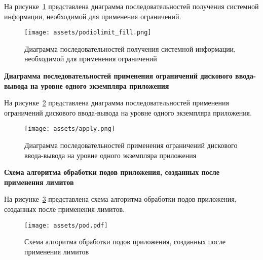 \newpage

На рисунке~\ref{img:fill} представлена диаграмма последовательностей получения системной информации, необходимой для применения ограничений.

\begin{figure}[h!]
    \centering
    \texttt{[image: assets/podiolimit\_fill.png]}
    \caption{Диаграмма последовательностей получения системной информации, необходимой для применения ограничений}
    \label{img:fill}
\end{figure}

\newpage

\textbf{Диаграмма последовательностей применения ограничений дискового ввода-вывода на уровне одного экземпляра приложения}

На рисунке~\ref{img:podiolimit} представлена диаграмма последовательностей применения ограничений дискового ввода-вывода на уровне одного экземпляра приложения.

\begin{figure}[h!]
    \centering
    \texttt{[image: assets/apply.png]}
    \caption{Диаграмма последовательностей применения ограничений дискового ввода-вывода на уровне одного экземпляра приложения}
    \label{img:podiolimit}
\end{figure}

\newpage

\textbf{Схема алгоритма обработки подов приложения, созданных после применения лимитов}

На рисунке~\ref{img:pod} представлена схема алгоритма обработки подов приложения, созданных после применения лимитов.

\begin{figure}[h!]
    \centering
    \texttt{[image: assets/pod.pdf]}
    \caption{Схема алгоритма обработки подов приложения, созданных после применения лимитов}
    \label{img:pod}
\end{figure}


